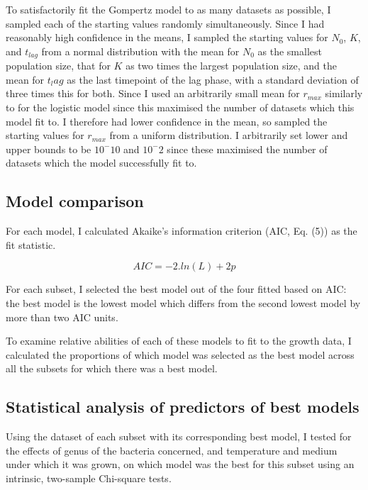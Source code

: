 \documentclass[11pt]{article}
\begin{document}
	To satisfactorily fit the Gompertz model to as many datasets as possible, I sampled each of the starting values randomly simultaneously. Since I had reasonably high confidence in the means, I sampled the starting values for $N_0$, $K$, and $t_{lag}$ from a normal distribution with the mean for $N_0$ as the smallest population size, that for $K$ as two times the largest population size, and the mean for $t_lag$ as the last timepoint of the lag phase, with a standard deviation of three times this for both. Since I used an arbitrarily small mean for $r_{max}$ similarly to for the logistic model since this maximised the number of datasets which this model fit to. I therefore had lower confidence in the mean, so sampled the starting values for $r_{max}$ from a uniform distribution. I arbitrarily set lower and upper bounds to be $10^-10$ and $10^-2$ since these maximised the number of datasets which the model successfully fit to.
	
	
	\subsection{Model comparison}
	
	For each model, I calculated Akaike's information criterion (AIC, Eq. (5)) as the fit statistic. 
	
	\begin{equation}
		AIC = -2.ln(L) + 2p
	\end{equation}
	
	For each subset, I selected the best model out of the four fitted based on AIC: the best model is the lowest model which differs from the second lowest model by more than two AIC units.
	
	To examine relative abilities of each of these models to fit to the growth data, I calculated the proportions of which model was selected as the best model across all the subsets for which there was a best model. 
	
	
	\subsection{Statistical analysis of predictors of best models}
	
	Using the dataset of each subset with its corresponding best model, I tested for the effects of genus of the bacteria concerned, and temperature and medium under which it was grown, on which model was the best for this subset using an intrinsic, two-sample Chi-square tests.
	
\end{document}
